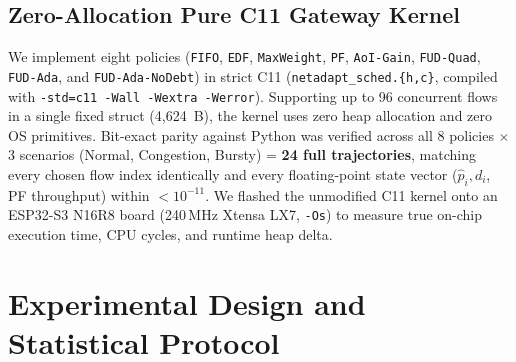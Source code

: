 \documentclass[journal]{IEEEtran}
\begin{document}
\subsection{Zero-Allocation Pure C11 Gateway Kernel}
We implement eight policies (\texttt{FIFO}, \texttt{EDF}, \texttt{MaxWeight}, \texttt{PF}, \texttt{AoI-Gain}, \texttt{FUD-Quad}, \texttt{FUD-Ada}, and \texttt{FUD-Ada-NoDebt}) in strict C11 (\texttt{netadapt\_sched.\{h,c\}}, compiled with \texttt{-std=c11 -Wall -Wextra -Werror}). Supporting up to 96 concurrent flows in a single fixed struct (4,624~B), the kernel uses zero heap allocation and zero OS primitives. Bit-exact parity against Python was verified across all 8 policies $\times$ 3 scenarios (Normal, Congestion, Bursty) = \textbf{24 full trajectories}, matching every chosen flow index identically and every floating-point state vector ($\hat{p}_i, d_i$, PF throughput) within $<10^{-11}$. We flashed the unmodified C11 kernel onto an ESP32-S3 N16R8 board (240\,MHz Xtensa LX7, \texttt{-Os}) to measure true on-chip execution time, CPU cycles, and runtime heap delta.

\section{Experimental Design and Statistical Protocol}
\end{document}
